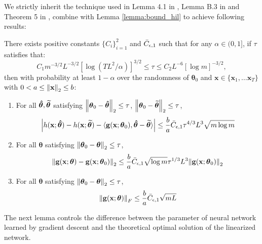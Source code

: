 We strictly inherit the technique used in Lemma 4.1 in \citet{cao2019generalization}, Lemma B.3 in \citet{cao2019generalization} and Theorem 5 in \citet{allen2019convergence}, combine with Lemma \ref{lemma:bound_hil} to achieve following results:
\begin{sublemma}
\label{lemma:NTK_related_bounds}
There exists positive constants $\{C_i\}^2_{i=1}$ and $\Bar{C}_{\epsilon,1}$ such that for any $\alpha  \in (0,1]$, if $\tau$ satisfies that:
\[C_{1}m^{-3/2}L^{-3/2}\left[\log(T L^2/\alpha)\right]^{3/2}\leq\tau\leq C_{2}L^{-6}[\log m]^{-3/2},\] then with probability at least $1-\alpha$ over the randomness of $\boldsymbol{\theta}_0$ and $\mathbf{x} \in \{\mathbf{x}_1, \dots \mathbf{x}_T\}$ with $0<  a \le \norm{\mathbf{x}}_2 \le b$:
\begin{enumerate}
    \item For all  $\boldsymbol{\Hat{\theta}}, \boldsymbol{\widetilde{\theta}}$  satisfying $\norm{\boldsymbol{\theta}_0 -  \boldsymbol{\Hat{\theta}}}_2 \le \tau$, $\norm{\boldsymbol{\theta}_0 -  \boldsymbol{\widetilde{\theta}}}_2 \leq \tau$, 
    \[\left \lvert h(\mathbf{x};\boldsymbol{\Hat \theta}) - h(\mathbf{x}; \boldsymbol{\widetilde{\theta}}) - \langle \mathbf{g}(\mathbf{x}; \boldsymbol{\theta}_0), \boldsymbol{\Hat \theta} - \boldsymbol{\widetilde{\theta}} \rangle  \right\rvert  \leq  \frac{b}{a} \Bar{C}_{\epsilon,1}   \tau^{4/3}L^{3}\sqrt{m\log m}\]
    \label{res:true_f_vs_linear}
    
    \item For all  $\boldsymbol{\theta}$  satisfying $\norm{\boldsymbol{\theta}_0 -  \boldsymbol{\theta}}_2 \le \tau$, 
    \[ \norm{\mathbf{g}(\mathbf{x}; \boldsymbol{\theta}) - \mathbf{g}(\mathbf{x}; \boldsymbol{\theta}_0)}_2 \leq \frac{b}{a} \Bar{C}_{\epsilon,1} \sqrt{\log m}\tau^{1/3}L^{3} \norm{\mathbf{g}(\mathbf{x};\boldsymbol{\theta}_0)}_2\]
    
    \label{res:grad_diff_bound}
    
    \item For all  $\boldsymbol{\theta}$  satisfying $\norm{\boldsymbol{\theta}_0 -  \boldsymbol{\theta}}_2 \le \tau$, 
    \[\norm{\mathbf{g}(\mathbf{x};\boldsymbol{\theta})}_F \leq \frac{b}{a} \Bar{C}_{\epsilon,1} \sqrt{mL}\] 
    
    \label{res:grad_bound}
\end{enumerate}
\end{sublemma}
The next lemma controls the difference between the
parameter of neural network learned by gradient descent and the theoretical optimal solution of the linearized network. 


